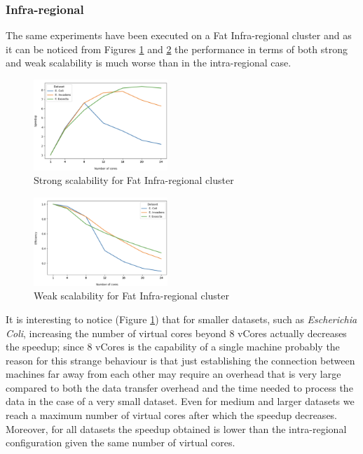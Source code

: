 \documentclass[final,5p,times,twocolumn,authoryear]{elsarticle}
\begin{document}
\subsubsection{Infra-regional}
The same experiments have been executed on a Fat Infra-regional cluster and as it can be noticed from Figures \ref{fig:fat-infra-strong} and \ref{fig:fat-infra-weak} the performance in terms of both strong and weak scalability is much worse than in the intra-regional case. \\
\begin{figure}[H]
    \centering
    \includegraphics[width=0.45\textwidth]{images/fat_infra_strong.png}
    \caption{Strong scalability for Fat Infra-regional cluster }
    \label{fig:fat-infra-strong}
\end{figure}
\begin{figure}[H]
    \centering
    \includegraphics[width=0.45\textwidth]{images/fat_infra_weak.png}
    \caption{Weak scalability for Fat Infra-regional cluster }
    \label{fig:fat-infra-weak}
\end{figure}
It is interesting to notice (Figure \ref{fig:fat-infra-strong}) that for smaller datasets, such as \emph{Escherichia Coli}, increasing the number of virtual cores beyond 8 vCores actually decreases the speedup; since 8 vCores is the capability of a single machine probably the reason for this strange behaviour is that just establishing the connection between machines far away from each other may require an overhead that is very large compared to both the data transfer overhead and the time needed to process the data in the case of a very small dataset. Even for medium and larger datasets we reach a maximum number of virtual cores after which the speedup decreases. Moreover, for all datasets the speedup obtained is lower than the intra-regional configuration given the same number of virtual cores. \\ 
\end{document}
